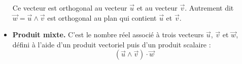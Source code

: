 \documentclass[11pt,class=report,crop=false]{standalone}
\begin{document}
\begin{cours}[Vecteurs]
\begin{itemize}
	Ce vecteur est orthogonal au vecteur $\vec u$ et au vecteur $\vec v$. Autrement dit $\vec w = \vec u \wedge \vec v$ est orthogonal au plan qui contient $\vec u$ et $\vec v$.
	
	
	
	\item \textbf{Produit mixte.}
	C'est le nombre réel associé à trois vecteurs $\vec u$, $\vec v$ et $\vec w$, défini à l'aide d'un produit vectoriel puis d'un produit scalaire :
	$$(\vec u \wedge \vec v) \cdot \vec w$$
				
\end{itemize}	
\end{cours}

\end{document}
